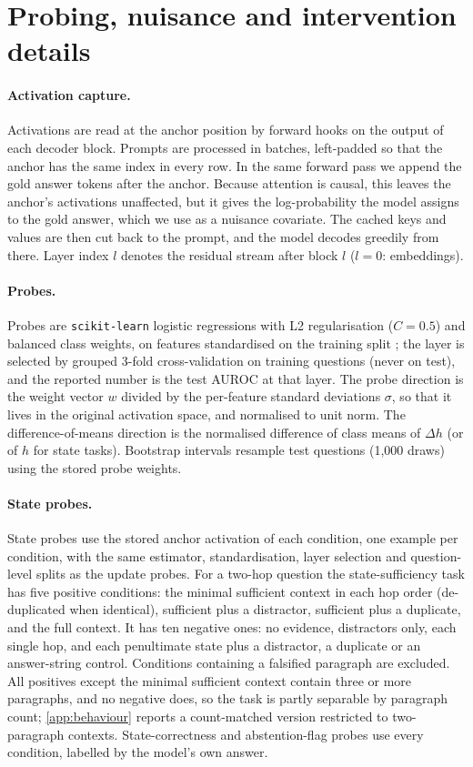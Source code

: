 \section{Probing, nuisance and intervention details}
\label{app:probing}
\paragraph{Activation capture.} Activations are read at the anchor position by forward hooks on the output of each decoder block. Prompts are processed in batches, left-padded so that the anchor has the same index in every row. In the same forward pass we append the gold answer tokens after the anchor. Because attention is causal, this leaves the anchor's activations unaffected, but it gives the log-probability the model assigns to the gold answer, which we use as a nuisance covariate. The cached keys and values are then cut back to the prompt, and the model decodes greedily from there. Layer index $l$ denotes the residual stream after block $l$ ($l=0$: embeddings).

\paragraph{Probes.} Probes are \texttt{scikit-learn} logistic regressions with L2 regularisation ($C=0.5$) and balanced class weights, on features standardised on the training split \cite{alain2016probes}; the layer is selected by grouped 3-fold cross-validation on training questions (never on test), and the reported number is the test AUROC at that layer. The probe direction is the weight vector $w$ divided by the per-feature standard deviations $\sigma$, so that it lives in the original activation space, and normalised to unit norm. The difference-of-means direction is the normalised difference of class means of $\Delta h$ (or of $h$ for state tasks). Bootstrap intervals resample test questions (1{,}000 draws) using the stored probe weights.

\paragraph{State probes.} State probes use the stored anchor activation of each condition, one example per condition, with the same estimator, standardisation, layer selection and question-level splits as the update probes. For a two-hop question the state-sufficiency task has five positive conditions: the minimal sufficient context in each hop order (de-duplicated when identical), sufficient plus a distractor, sufficient plus a duplicate, and the full context. It has ten negative ones: no evidence, distractors only, each single hop, and each penultimate state plus a distractor, a duplicate or an answer-string control. Conditions containing a falsified paragraph are excluded. All positives except the minimal sufficient context contain three or more paragraphs, and no negative does, so the task is partly separable by paragraph count; \cref{app:behaviour} reports a count-matched version restricted to two-paragraph contexts. State-correctness and abstention-flag probes use every condition, labelled by the model's own answer.

